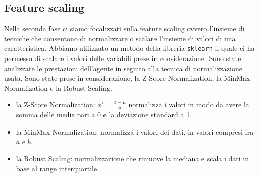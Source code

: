 \newpage
\subsection{Feature scaling}
\fancyhead{}    %
\label{paragrafo 3.2}
Nella seconda fase ci siamo focalizzati sulla feature scaling ovvero l’insieme di tecniche che consentono di normalizzare o scalare l’insieme di valori di una caratteristica. Abbiamo utilizzato un metodo della libreria \texttt{sklearn} il quale ci ha permesso di scalare i valori delle variabili prese in considerazione. Sono state analizzate le prestazioni dell’agente in seguito alla tecnica di normalizzazione usata. Sono state prese in considerazione, la Z-Score Normalization, la MinMax Normalization e la Robust Scaling.
\begin{itemize}
    \item la Z-Score Normalization: \( x' = \frac{x - \mu}{\sigma} \) normalizza i valori in modo da avere la somma delle medie pari a 0 e la deviazione standard a 1.
    \item la MinMax Normalization: normalizza i valori dei dati, in valori compresi fra \(a\) e \(b\).
    \item la Robust Scaling: normalizzazione che rimuove la mediana e scala i dati in base al range interquartile.
\end{itemize}
